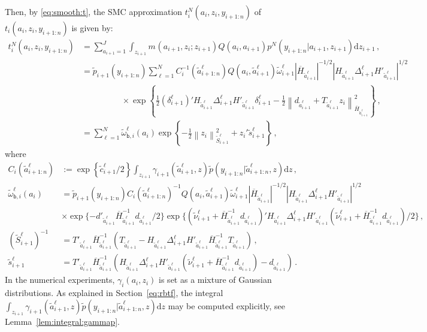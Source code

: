 \documentclass[nolayout]{article}
\theoremstyle{plain}
\theoremstyle{definition}
\newcommand{\1}{\mathbbm{1}}
\def\rmd{\mathrm{d}}
\def\barH{\overline{H}}
\def\eqsp{\,}
\newcommand{\normMat}[2]{\left\|#2\right\|_{#1}}
\newcommand{\eqdef}{\ensuremath{:=}}
\begin{document}
Then, by \eqref{eq:smooth:t}, the SMC approximation $t^N_{i}(a_i,z_i,y_{i+1:n})$ of $t_{i}(a_i,z_i,y_{i+1:n})$ is given by:
\begin{align}
t^N_{i}(a_i,z_i,y_{i+1:n}) &=\sum_{a_{i+1}=1}^J\int_{z_{i+1}}m_{}(a_{i+1},z_{i};z_{i+1})Q(a_{i},a_{i+1})p^N_{}(y_{i+1:n}|a_{i+1},z_{i+1}) \rmd z_{i+1}\eqsp,\nonumber\\
&=  \tilde{p}_{i+1}(y_{i+1:n}) \sum_{\ell=1}^N C_i^{-1}(\tilde{a}^{\ell}_{i+1:n}) Q(a_i, \tilde{a}^{\ell}_{i+1}) \tilde{\omega}^{\ell}_{i+1} |\barH_{\tilde{a}^{\ell}_{i+1}}|^{-1/2} |H_{\tilde{a}^{\ell}_{i+1}} \Delta^{\ell}_{i+1} H'_{\tilde{a}^{\ell}_{i+1}}|^{1/2} \eqsp\nonumber \\
&\hspace{2cm} \times \exp\left\{\frac{1}{2} (\delta^{\ell}_{i+1})'H_{\tilde{a}^{\ell}_{i+1}}\Delta^{\ell}_{i+1}H'_{\tilde{a}^{\ell}_{i+1}} \delta^{\ell}_{i+1} -\frac{1}{2}\normMat{\barH_{\tilde{a}^{\ell}_{i+1}}}{d_{\tilde{a}^{\ell}_{i+1}}+T_{\tilde{a}^{\ell}_{i+1}}z_i}^2\right\} \eqsp,\nonumber\\
&= \sum_{\ell=1}^N\tilde{\omega}_{\mathsf{b},i}^\ell(a_i)\exp\left\{-\frac{1}{2}\normMat{\tilde{S}_{i+1}^\ell}{z_i}^2+z_i'\tilde{s}_{i+1}^\ell\right\}\eqsp,\label{eq:tN}
\end{align}
where
\begin{align*}
C_i(\tilde{a}^{\ell}_{i+1:n}) &\eqdef \exp \left\{\tilde{c}^{\ell}_{i+1}/2\right\}  \int_{z_{i+1}} \gamma^{}_{i+1}(\tilde{a}^{\ell}_{i+1}, z)\tilde{p}(y_{i+1:n}|\tilde{a}^{\ell}_{i+1:n},z) \rmd z\eqsp,\\
\tilde{\omega}_{\mathsf{b},i}^\ell(a_i) &= \tilde{p}_{i+1}(y_{i+1:n})C_i(\tilde{a}^{\ell}_{i+1:n})^{-1}Q(a_i, \tilde{a}^{\ell}_{i+1}) \tilde{\omega}^{\ell}_{i+1} |\barH_{\tilde{a}^{\ell}_{i+1}}|^{-1/2} |H_{\tilde{a}^{\ell}_{i+1}} \Delta^{\ell}_{i+1} H'_{\tilde{a}^{\ell}_{i+1}}|^{1/2}\\
&\times\exp\{-d'_{\tilde{a}^\ell_{i+1}}\barH_{\tilde{a}^\ell_{i+1}}^{-1}d_{\tilde{a}^\ell_{i+1}}/2\}\exp\{(\tilde{\nu}^{\ell}_{i+1} + \barH_{\tilde{a}^\ell_{i+1}}^{-1}d_{\tilde{a}^\ell_{i+1}})'H_{\tilde{a}^{\ell}_{i+1}}\Delta^{\ell}_{i+1}H'_{\tilde{a}^{\ell}_{i+1}}(\tilde{\nu}^{\ell}_{i+1} + \barH_{\tilde{a}^\ell_{i+1}}^{-1}d_{\tilde{a}^\ell_{i+1}})/2\} \eqsp,\\
(\tilde{S}_{i+1}^\ell)^{-1} &= T'_{\tilde{a}^{\ell}_{i+1}}\barH_{\tilde{a}^\ell_{i+1}}^{-1}(T_{\tilde{a}^{\ell}_{i+1}}-H_{\tilde{a}^{\ell}_{i+1}}\Delta^{\ell}_{i+1}H'_{\tilde{a}^{\ell}_{i+1}}\barH_{\tilde{a}^\ell_{i+1}}^{-1}T_{\tilde{a}^{\ell}_{i+1}})\eqsp,\\
\tilde{s}_{i+1}^\ell &=T'_{\tilde{a}^{\ell}_{i+1}}\barH_{\tilde{a}^\ell_{i+1}}^{-1}(H_{\tilde{a}^{\ell}_{i+1}}\Delta^{\ell}_{i+1}H'_{\tilde{a}^{\ell}_{i+1}}(\tilde{\nu}^{\ell}_{i+1} + \barH_{\tilde{a}^\ell_{i+1}}^{-1}d_{\tilde{a}^\ell_{i+1}})-d_{\tilde{a}^\ell_{i+1}})\eqsp.
\end{align*}
In the numerical experiments, $\gamma^{}_i(a_i,z_i)$ is set as a mixture of Gaussian distributions. As explained in Section~\ref{eq:rbtf}, the integral $\int_{z_{i+1}} \gamma^{}_{i+1}(\tilde{a}^{\ell}_{i+1}, z)\tilde{p}(y_{i+1:n}|\tilde{a}^{\ell}_{i+1:n},z) \rmd z$ may be computed explicitly, see Lemma~\ref{lem:integral:gammap}.
\end{document}
